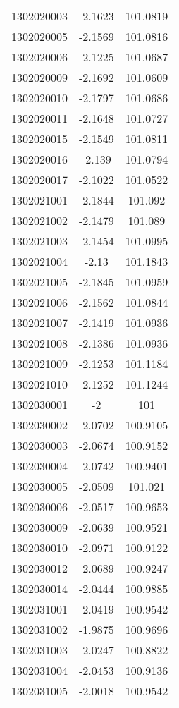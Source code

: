 \begin{longtable}[h]{lcc}
		1302020003 & -2.1623 & 101.0819\\ 
		1302020005 & -2.1569 & 101.0816\\ 
		1302020006 & -2.1225 & 101.0687\\ 
		1302020009 & -2.1692 & 101.0609\\ 
		1302020010 & -2.1797 & 101.0686\\ 
		1302020011 & -2.1648 & 101.0727\\ 
		1302020015 & -2.1549 & 101.0811\\ 
		1302020016 & -2.139 & 101.0794\\ 
		1302020017 & -2.1022 & 101.0522\\ 
		1302021001 & -2.1844 & 101.092\\ 
		1302021002 & -2.1479 & 101.089\\ 
		1302021003 & -2.1454 & 101.0995\\ 
		1302021004 & -2.13 & 101.1843\\ 
		1302021005 & -2.1845 & 101.0959\\ 
		1302021006 & -2.1562 & 101.0844\\ 
		1302021007 & -2.1419 & 101.0936\\ 
		1302021008 & -2.1386 & 101.0936\\ 
		1302021009 & -2.1253 & 101.1184\\ 
		1302021010 & -2.1252 & 101.1244\\ 
		1302030001 & -2 & 101\\ 
		1302030002 & -2.0702 & 100.9105\\ 
		1302030003 & -2.0674 & 100.9152\\ 
		1302030004 & -2.0742 & 100.9401\\ 
		1302030005 & -2.0509 & 101.021\\ 
		1302030006 & -2.0517 & 100.9653\\ 
		1302030009 & -2.0639 & 100.9521\\ 
		1302030010 & -2.0971 & 100.9122\\ 
		1302030012 & -2.0689 & 100.9247\\ 
		1302030014 & -2.0444 & 100.9885\\ 
		1302031001 & -2.0419 & 100.9542\\ 
		1302031002 & -1.9875 & 100.9696\\ 
		1302031003 & -2.0247 & 100.8822\\ 
		1302031004 & -2.0453 & 100.9136\\ 
		1302031005 & -2.0018 & 100.9542\\ 

\end{longtable}
